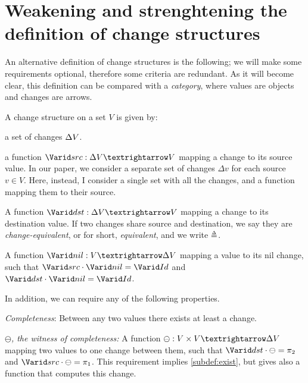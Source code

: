 \section{Weakening and strenghtening the definition of change structures}
An alternative definition of change structures is the following; we will make
some requirements optional, therefore some criteria are redundant. As it will
become clear, this definition can be compared with a \emph{category}, where
values are objects and changes are arrows.
\begin{definition}
A change structure on a set $V$ is given by:
\begin{subdefinition}
\item a set of changes $\Delta V$.
\item\label{subdef:src} a function $\Term{src} : \GD V → V$ mapping a change to
  its source value. In our paper, we consider a separate set of changes
  $\Delta v$ for each source $v \in V$. Here, instead, I consider a single set
  with all the changes, and a function mapping them to their source.
\item\label{subdef:dst} A function $\Term{dst} : \GD V → V$ mapping a change to
  its destination value. If two changes share source and destination, we say
  they are \emph{change-equivalent}, or for short,
  \emph{equivalent}, and we write $\Doe$.
\item\label{subdef:nil} A function $\Term{nil} : V → \GD V$ mapping a value to
  its nil change, such that $\Term{src} \cdot \Term{nil} = \Term{Id}$ and
  $\Term{dst} \cdot \Term{nil} = \Term{Id}$.
\end{subdefinition}
In addition, we can require any of the following properties.
\begin{subdefinition}[resume]
\item\label{subdef:exist} \emph{Completeness}: Between any two values there exists
  at least a change.
\item\label{subdef:ominus} \emph{$\ominus$, the witness of completeness:} A
  function $\ominus : V \times V → \GD V$ mapping two values to one change
  between them, such that $\Term{dst} \cdot \ominus = \pi_2$ and
  $\Term{src} \cdot \ominus = \pi_1$. This requirement implies
  \cref{subdef:exist}, but gives also a function that computes this change.


\end{subdefinition}
\end{definition}
